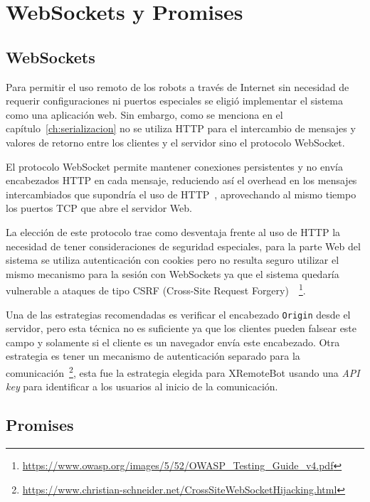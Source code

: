 \chapter{WebSockets y Promises}\label{ch:websockets_y_promises}

\section{WebSockets}

Para permitir el uso remoto de los robots a través de Internet sin necesidad
de requerir configuraciones ni puertos especiales se eligió implementar el
sistema como una
aplicación web. Sin embargo, como se menciona en el
capítulo~\ref{ch:serializacion} no se utiliza HTTP para el intercambio de
mensajes y valores de retorno entre los clientes y el servidor sino el
protocolo WebSocket.

El protocolo WebSocket permite mantener conexiones persistentes y no envía
encabezados HTTP en cada mensaje, reduciendo así el overhead en los mensajes
intercambiados que supondría el uso de HTTP~\citep{wang_2013}, aprovechando al
mismo tiempo los puertos TCP que abre el servidor Web.

La elección de este protocolo trae como desventaja frente al uso de HTTP la
necesidad de tener consideraciones de seguridad especiales, para la parte
Web del sistema se utiliza autenticación con cookies pero no resulta seguro
utilizar el mismo mecanismo para la sesión con WebSockets ya que el sistema
quedaría vulnerable a ataques de tipo CSRF (Cross-Site Request
Forgery)~\citep{owasp_2014}~\footnote{
\url{https://www.owasp.org/images/5/52/OWASP_Testing_Guide_v4.pdf}}.

Una de las estrategias recomendadas es verificar el encabezado \texttt{Origin}
desde el servidor, pero esta técnica no es suficiente ya que los
clientes pueden falsear este campo y solamente si el cliente es un navegador
envía este encabezado.
Otra estrategia es tener un mecanismo de autenticación
separado para la comunicación~\footnote{\url{https://www.christian-schneider.net/CrossSiteWebSocketHijacking.html}},
esta fue la estrategia elegida para XRemoteBot usando una \textit{API key}
para identificar a los usuarios al inicio de la comunicación.

\section{Promises}

